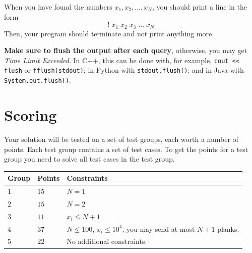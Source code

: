 When you have found the numbers $x_1, x_2, \dots, x_N$, you should print a line in the form 
$$! \; x_1 \; x_2 \; x_3 \; \dots \; x_N$$
Then, your program should terminate and not print anything more.

\textbf{Make sure to flush the output after each query}, otherwise, you may get \textit{Time Limit Exceeded}.
In C++, this can be done with, for example, \texttt{cout << flush} or \texttt{fflush(stdout)};
in Python with \texttt{stdout.flush()};
and in Java with \texttt{System.out.flush()}.


\section*{Scoring}
Your solution will be tested on a set of test groups, each worth a number of points. Each test group contains
a set of test cases. To get the points for a test group you need to solve all test cases in the test group.

\noindent
\begin{tabular}{| l | l | p{12cm} |}
  \hline
  \textbf{Group} & \textbf{Points} & \textbf{Constraints} \\ \hline
  $1$   & $15$       & $N = 1$\\ \hline
  $2$   & $15$       & $N = 2$  \\ \hline
  $3$   & $11$       & $x_i \leq N+1$ \\ \hline
  $4$   & $37$       & $N \leq 100$, $x_i \leq 10^4$, you may send at most $N+1$ planks. \\ \hline
  $5$   & $22$       & No additional constraints. \\ \hline
\end{tabular}

